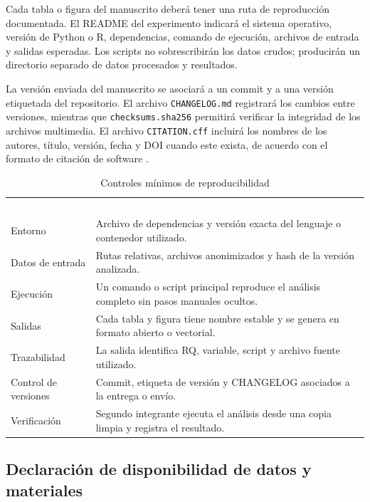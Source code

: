 \documentclass[12pt,a4paper]{article}
\begin{document}
Cada tabla o figura del manuscrito deberá tener una ruta de reproducción documentada. El README del experimento indicará el sistema operativo, versión de Python o R, dependencias, comando de ejecución, archivos de entrada y salidas esperadas. Los scripts no sobrescribirán los datos crudos; producirán un directorio separado de datos procesados y resultados.

La versión enviada del manuscrito se asociará a un commit y a una versión etiquetada del repositorio. El archivo \nolinkurl{CHANGELOG.md} registrará los cambios entre versiones, mientras que \nolinkurl{checksums.sha256} permitirá verificar la integridad de los archivos multimedia. El archivo \nolinkurl{CITATION.cff} incluirá los nombres de los autores, título, versión, fecha y DOI cuando este exista, de acuerdo con el formato de citación de software \cite{druskat2021}.

\begin{table}[H]
\centering
\caption{Controles mínimos de reproducibilidad}
\label{tab:controles-reproducibilidad}
\small
{}
\begin{tabularx}{\textwidth}{L{4.0cm} Y}
\textcolor{white}{\textbf{Control}} &
\textcolor{white}{\textbf{Criterio verificable}}\\
Entorno & Archivo de dependencias y versión exacta del lenguaje o contenedor utilizado.\\
Datos de entrada & Rutas relativas, archivos anonimizados y hash de la versión analizada.\\
Ejecución & Un comando o script principal reproduce el análisis completo sin pasos manuales ocultos.\\
Salidas & Cada tabla y figura tiene nombre estable y se genera en formato abierto o vectorial.\\
Trazabilidad & La salida identifica RQ, variable, script y archivo fuente utilizado.\\
Control de versiones & Commit, etiqueta de versión y CHANGELOG asociados a la entrega o envío.\\
Verificación & Segundo integrante ejecuta el análisis desde una copia limpia y registra el resultado.\\
\end{tabularx}
\end{table}

\subsection{Declaración de disponibilidad de datos y materiales}
\end{document}

